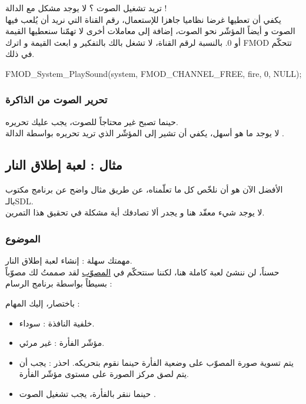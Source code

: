 تريد تشغيل الصوت ؟ لا يوجد مشكل مع الدالة
 !\\
يكفي أن تعطيها غرضا نظاميا جاهزا للإستعمال، رقم القناة التي نريد أن يُلعب فيها الصوت و أيضاً المؤشّر نحو الصوت، إضافة إلى معاملات أخرى لا تهمّنا سنعطيها القيمة
أو 0. بالنسبة لرقم القناة، لا تشغل بالك بالتفكير و ابعث القيمة
و اترك
\textenglish{FMOD}
تتحكّم في ذلك.

\begin{Csource}
FMOD_System_PlaySound(system, FMOD_CHANNEL_FREE, fire, 0, NULL);
\end{Csource}

\subsubsection{تحرير الصوت من الذاكرة}

حينما تصبح غير محتاجاً للصوت، يجب عليك تحريره. \\
لا يوجد ما هو أسهل، يكفي أن تشير إلى المؤشّر الذي تريد تحريره بواسطة الدالة
.


\subsection{مثال : لعبة إطلاق النار}

الأفضل الآن هو أن نلخّص كل ما تعلّمناه، عن طريق مثال واضح عن برنامج مكتوب بالـ\textenglish{SDL}.\\
لا يوجد شيء معقّد هنا و يجدر ألا تصادفك أية مشكلة في تحقيق هذا التمرين.

\subsubsection{الموضوع}

مهمتك سهلة : إنشاء لعبة إطلاق النار.\\
حسناً، لن ننشئ لعبة كاملة هنا، لكننا سنتحكّم في
\underline{المصوّب}
 لقد صممتُ لك مصوّباً بسيطاً بواسطة برنامج الرسام :


باختصار، إليك المهام :

\begin{itemize}
	\item خلفية النافذة : سوداء.
	\item مؤشّر الفأرة : غير مرئي.
	\item يتم تسوية صورة المصوّب على وضعية الفأرة حينما نقوم بتحريكه. احذر : يجب أن يتم لصق مركز الصورة على مستوى مؤشّر الفأرة.
	\item حينما ننقر بالفأرة، يجب تشغيل الصوت
	.
\end{itemize}

